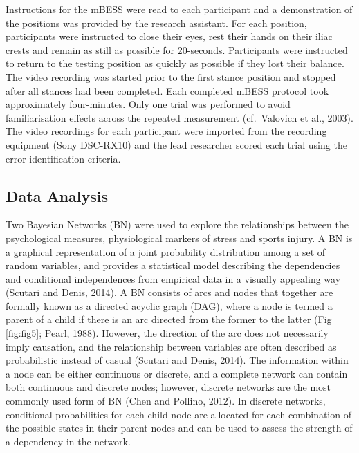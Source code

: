 \documentclass[
  english,
  man]{apa6}
\begin{document}
Instructions for the mBESS were read to each participant and a demonstration of the positions was provided by the research assistant.
For each position, participants were instructed to close their eyes, rest their hands on their iliac crests and remain as still as possible for 20-seconds.
Participants were instructed to return to the testing position as quickly as possible if they lost their balance.
The video recording was started prior to the first stance position and stopped after all stances had been completed.
Each completed mBESS protocol took approximately four-minutes.
Only one trial was performed to avoid familiarisation effects across the repeated measurement (cf.~Valovich et al., 2003).
The video recordings for each participant were imported from the recording equipment (Sony DSC-RX10) and the lead researcher scored each trial using the error identification criteria.

\hypertarget{data-analysis}{%
\subsection{Data Analysis}\label{data-analysis}}

Two Bayesian Networks (BN) were used to explore the relationships between the psychological measures, physiological markers of stress and sports injury.
A BN is a graphical representation of a joint probability distribution among a set of random variables, and provides a statistical model describing the dependencies and conditional independences from empirical data in a visually appealing way (Scutari and Denis, 2014).
A BN consists of arcs and nodes that together are formally known as a directed acyclic graph (DAG), where a node is termed a parent of a child if there is an arc directed from the former to the latter (Fig \ref{fig:fig5}; Pearl, 1988).
However, the direction of the arc does not necessarily imply causation, and the relationship between variables are often described as probabilistic instead of casual (Scutari and Denis, 2014).
The information within a node can be either continuous or discrete, and a complete network can contain both continuous and discrete nodes; however, discrete networks are the most commonly used form of BN (Chen and Pollino, 2012). In discrete networks, conditional probabilities for each child node are allocated for each combination of the possible states in their parent nodes and can be used to assess the strength of a dependency in the network.
\end{document}
